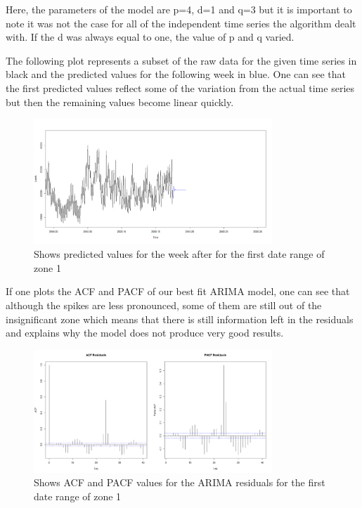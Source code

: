 \documentclass{article} %
\begin{document}
Here, the parameters of the model are p=4, d=1 and q=3 but it is important to note it was not the case for all of the independent time series the algorithm dealt with. If the d was always equal to one, the value of p and q varied. 

The following plot represents a subset of the raw data for the given time series in black and the predicted values for the following week in blue. One can see that the first predicted values reflect some of the variation from the actual time series but then the remaining values become linear quickly.

\begin{figure}[H]
  \centering
    \includegraphics[width=0.80\textwidth]{LoadsPred}
  \caption{Shows predicted values for the week after for the first date range of zone 1 }
\end{figure}

If one plots the ACF and PACF of our best fit ARIMA model, one can see that although the spikes are less pronounced, some of them are still out of the insignificant zone which means that there is still information left in the residuals and explains why the model does not produce very good results.

\begin{figure}[H]
  \centering
    \includegraphics[width=0.80\textwidth]{ACFandPACFLoadsArimaResults}
  \caption{Shows ACF and PACF values for the ARIMA residuals for the first date range of zone 1 }
\end{figure}
\end{document}
